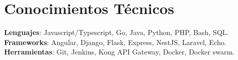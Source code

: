 \section{Conocimientos Técnicos}
    \begin{itemize}[leftmargin=0.15in, label={}]
	\small{\item{
		\textbf{Lenguajes}{: Javascript/Typescript, Go, Java, Python, PHP, Bash, SQL. } \\
		\textbf{Frameworks}{: Angular, Django, Flask, Express, NestJS, Laravel, Echo. } \\
		\textbf{Herramientas}{: Git, Jenkins, Kong API Gateway, Docker, Docker swarm. }
	}}
    \end{itemize}
